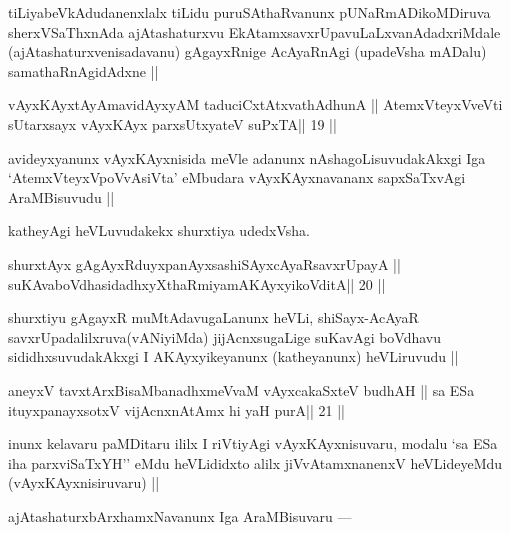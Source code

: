 \begin{artha}
tiLiyabeVkAdudanenxlalx tiLidu puruSAthaRvanunx pUNaRmADikoMDiruva sherxVSaThxnAda ajAtashaturxvu EkAtamxsavxrUpavuLaLxvanAdadxriMdale (ajAtashaturxvenisadavanu) gAgayxRnige AcAyaRnAgi (upadeVsha mADalu) samathaRnAgidAdxne ||
\end{artha}

\begin{shl}
vAyxKAyxtAyAmavidAyxyAM taduciCxtAtxvathAdhunA ||
AtemxVteyxVveVti sUtarxsayx vAyxKAyx parxsUtxyateV suPxTA\hfill || 19 ||
\end{shl}

\begin{artha}
avideyxyanunx vAyxKAyxnisida meVle adanunx nAshagoLisuvudakAkxgi Iga `AtemxVteyxVpoVvAsiVta' eMbudara vAyxKAyxnavananx sapxSaTxvAgi AraMBisuvudu ||
\end{artha}

\begin{artha}
katheyAgi heVLuvudakekx shurxtiya udedxVsha.
\end{artha} 

\begin{shl}
shurxtAyx gAgAyxRduyxpanAyxsashiSAyxcAyaRsavxrUpayA ||
suKAvaboVdhasidadhxyXthaRmiyamAKAyxyikoVditA\hfill || 20 ||
\end{shl}

\begin{artha}
shurxtiyu gAgayxR muMtAdavugaLanunx heVLi, shiSayx-AcAyaR savxrUpadalilxruva(vANiyiMda) jijAcnxsugaLige suKavAgi boVdhavu sididhxsuvudakAkxgi I AKAyxyikeyanunx (katheyanunx) heVLiruvudu ||
\end{artha}


\begin{shl}
aneyxV tavxtArxBisaMbanadhxmeVvaM vAyxcakaSxteV budhAH ||
sa ESa ituyxpanayxsotxV vijAcnxnAtAmx hi yaH purA\hfill || 21 ||
\end{shl}

\begin{artha}
inunx kelavaru paMDitaru ililx I riVtiyAgi vAyxKAyxnisuvaru, modalu 
`sa ESa iha parxviSaTxYH'' eMdu heVLididxto alilx jiVvAtamxnanenxV heVLideyeMdu (vAyxKAyxnisiruvaru) ||
\end{artha}

\begin{artha}
ajAtashaturxbArxhamxNavanunx Iga AraMBisuvaru --- 
\end{artha}

